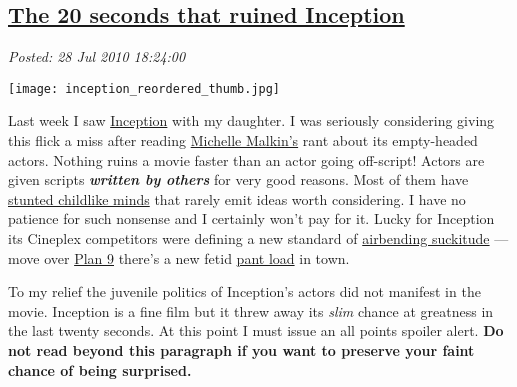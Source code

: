 %

\subsection*{\href{http://bakerjd99.wordpress.com/2010/07/28/the-20-seconds-that-ruined-inception/}{The 20 seconds that ruined Inception}}


\noindent\emph{Posted: 28 Jul 2010 18:24:00}
\vspace{6pt}


\captionsetup[floatingfigure]{labelformat=empty}
\begin{floatingfigure}[l]{0.21\textwidth}
\centering
\texttt{[image: inception\_reordered\_thumb.jpg]}
\label{fig:696X0}
\end{floatingfigure}Last week I saw
\href{http://www.rottentomatoes.com/m/inception/}{Inception} with my
daughter. I was seriously considering giving this flick a miss after
reading
\href{http://michellemalkin.com/2010/07/17/if-you-miss-just-one-movie-this-year-make-it-inception/}{Michelle
Malkin's} rant about its empty-headed actors. Nothing ruins a movie
faster than an actor going off-script! Actors are given scripts
\textbf{\emph{written by others}} for very good reasons. Most of them
have
\href{http://www.huffingtonpost.com/jim-carrey/the-judgment-on-vaccines\_b\_189777.html}{stunted
childlike minds} that rarely emit ideas worth considering. I have no
patience for such nonsense and I certainly won't pay for it. Lucky for
Inception its Cineplex competitors were defining a new standard of
\href{http://www.rottentomatoes.com/m/last\_airbender/}{airbending
suckitude} --- move over
\href{http://en.wikipedia.org/wiki/Plan\_9\_from\_Outer\_Space}{Plan 9}
there's a new fetid
\href{http://www.doubletongued.org/index.php/dictionary/pant\_load/}{pant
load} in town.


To my relief the juvenile politics of Inception's actors did not
manifest in the movie. Inception is a fine film but it threw away its
\emph{slim} chance at greatness in the last twenty seconds. At this
point I must issue an all points spoiler alert. \textbf{Do not read
beyond this paragraph if you want to preserve your faint chance of being
surprised.}

